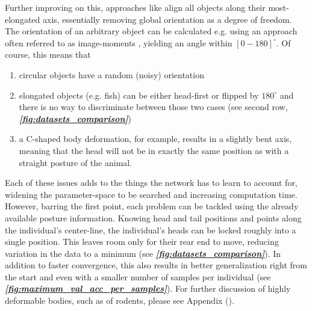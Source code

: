 \documentclass[9pt,lineno]{elife}
\newcommand{\figref}[1]{\textit{\textbf{\ref{#1}}}}
\newcommand{\idtracker}{\protect\path{ idtracker.ai}}
\begin{document}
Further improving on this, approaches like \idtracker{} align all objects along their most-elongated axis, essentially removing global orientation as a degree of freedom. The orientation of an arbitrary object can be calculated e.g. using an approach often referred to as image-moments \citep{hu1962visual}, yielding an angle within $[0-180]^\circ$. Of course, this means that

\begin{enumerate}
\item circular objects have a random (noisy) orientation
\item elongated objects (e.g. fish) can be either head-first or flipped by $180^\circ$ and there is no way to discriminate between those two cases (see second row, \figref{fig:datasets_comparison})
\item a C-shaped body deformation, for example, results in a slightly bent axis, meaning that the head will not be in exactly the same position as with a straight posture of the animal.
\end{enumerate}


Each of these issues adds to the things the network has to learn to account for, widening the parameter-space to be searched and increasing computation time. However, barring the first point, each problem can be tackled using the already available posture information. Knowing head and tail positions and points along the individual's center-line, the individual's heads can be locked roughly into a single position. This leaves room only for their rear end to move, reducing variation in the data to a minimum (see \figref{fig:datasets_comparison}). In addition to faster convergence, this also results in better generalization right from the start and even with a smaller number of samples per individual (see \figref{fig:maximum_val_acc_per_samples}). {\color{blue}For further discussion of highly deformable bodies, such as of rodents, please see Appendix ().}
\end{document}
